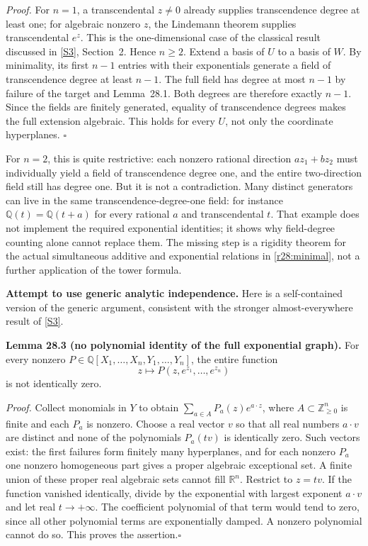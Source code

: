 \documentclass[11pt,a4paper]{article}
\newcommand{\Z}{\mathbb{Z}}
\newcommand{\Q}{\mathbb{Q}}
\newcommand{\R}{\mathbb{R}}
\newcommand{\sref}[2]{\hyperlink{source:#1:#2}{[S#2]}}
\numberwithin{equation}{section}
\begin{document}
\emph{Proof.} For $n=1$, a transcendental $z\ne0$ already supplies
transcendence degree at least one; for algebraic nonzero $z$, the
Lindemann theorem supplies transcendental $e^z$. This is the
one-dimensional case of the classical result discussed in
\sref{statement}{3}, Section~2. Hence $n\ge2$. Extend a basis of $U$ to a basis
of $W$. By minimality, its first $n-1$ entries with their exponentials
generate a field of transcendence degree at least $n-1$. The full field
has degree at most $n-1$ by failure of the target and Lemma~28.1. Both
degrees are therefore exactly $n-1$. Since the fields are finitely
generated, equality of transcendence degrees makes the full extension
algebraic. This holds for every $U$, not only the coordinate hyperplanes.
\hfill$\square$

For $n=2$, this is quite restrictive: each nonzero rational direction
$az_1+bz_2$ must individually yield a field of transcendence degree one,
and the entire two-direction field still has degree one. But it is not
a contradiction. Many distinct generators can live in the same
transcendence-degree-one field: for instance $\Q(t)=\Q(t+a)$ for every
rational $a$ and transcendental $t$. That example does not implement the
required exponential identities; it shows why field-degree counting alone
cannot replace them. The missing step is a rigidity theorem for the
actual simultaneous additive and exponential relations in
\eqref{r28:minimal}, not a further application of the tower formula.

\medskip
\textbf{Attempt to use generic analytic independence.}
Here is a self-contained version of the generic argument, consistent
with the stronger almost-everywhere result of \sref{statement}{3}.

\textbf{Lemma 28.3 (no polynomial identity of the full exponential graph).}
For every nonzero $P\in\Q[X_1,\ldots,X_n,Y_1,\ldots,Y_n]$, the entire
function
\[
                    z\longmapsto P(z,e^{z_1},\ldots,e^{z_n})
\]
is not identically zero.

\emph{Proof.} Collect monomials in $Y$ to obtain
$\sum_{a\in A}P_a(z)e^{a\cdot z}$, where $A\subset\Z_{\ge0}^n$ is finite
and each $P_a$ is nonzero. Choose a real vector $v$ so that all real
numbers $a\cdot v$ are distinct and none of the polynomials $P_a(tv)$
is identically zero. Such vectors exist: the first failures form finitely
many hyperplanes, and for each nonzero $P_a$ one nonzero homogeneous
part gives a proper algebraic exceptional set. A finite union of these
proper real algebraic sets cannot fill $\R^n$.
Restrict to $z=tv$. If the function vanished identically, divide by the
exponential with largest exponent $a\cdot v$ and let real $t\to+\infty$.
The coefficient polynomial of that term would tend to zero, since all
other polynomial terms are exponentially damped. A nonzero polynomial
cannot do so. This proves the assertion.\hfill$\square$
\end{document}
